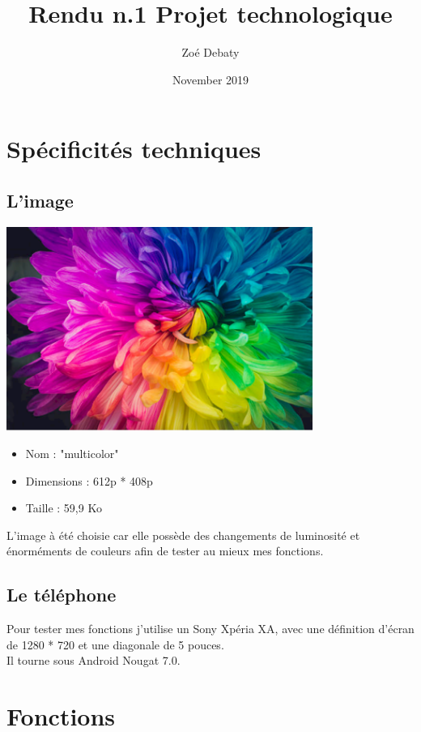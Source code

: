 \documentclass{article}
\title{Rendu n.1 Projet technologique}
\author{Zoé Debaty}
\date{November 2019}
\begin{document}
\maketitle
\tableofcontents 
\newpage

\section{Spécificités techniques}

\subsection{L'image}
\includegraphics[width=10cm]{../multicolor}

\begin{itemize}
\item Nom : "multicolor"
\item Dimensions : 612p * 408p
\item Taille : 59,9 Ko
\end{itemize}
\medbreak

L'image à été choisie car elle possède des changements de luminosité et énorméments de couleurs afin de tester au mieux mes fonctions.

\subsection{Le téléphone}

Pour tester mes fonctions j'utilise un Sony Xpéria XA, avec une définition d'écran de 1280 * 720 et une diagonale de 5 pouces.\\
Il tourne sous Android Nougat 7.0.

\newpage

\section{Fonctions}
\end{document}
